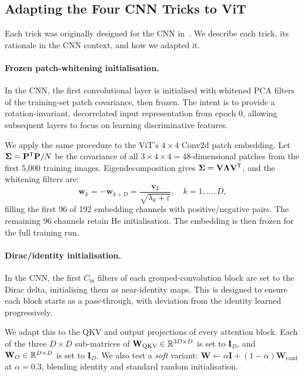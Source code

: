 \subsection{Adapting the Four CNN Tricks to ViT}

Each trick was originally designed for the CNN in~\cite{garg2024cifar10}.
We describe each trick, its rationale in the CNN context, and how we adapted it.

\paragraph{Frozen patch-whitening initialisation.}
In the CNN, the first convolutional layer is initialised with whitened PCA filters of the training-set patch covariance, then frozen.
The intent is to provide a rotation-invariant, decorrelated input representation from epoch 0, allowing subsequent layers to focus on learning discriminative features.

We apply the same procedure to the ViT's $4\times4$ Conv2d patch embedding.
Let $\mathbf{\Sigma} = \mathbf{P}^{\mathsf{T}} \mathbf{P}/N$ be the covariance of all $3\times4\times4 = 48$-dimensional patches from the first 5{,}000 training images.
Eigendecomposition gives $\mathbf{\Sigma} = \mathbf{V} \mathbf{\Lambda} \mathbf{V}^{\mathsf{T}}$, and the whitening filters are:
\begin{equation}
    \mathbf{w}_k = -\mathbf{w}_{k+D} =
    \frac{\mathbf{v}_k}{\sqrt{\lambda_k + \varepsilon}},
    \quad k=1,\dots,D,
\end{equation}
filling the first 96 of 192 embedding channels with positive/negative pairs.
The remaining 96 channels retain He initialisation.
The embedding is then frozen for the full training run.

\paragraph{Dirac/identity initialisation.}
In the CNN, the first $C_\text{in}$ filters of each grouped-convolution block are set to the Dirac delta, initialising them as near-identity maps.
This is designed to ensure each block starts as a pass-through, with deviation from the identity learned progressively.

We adapt this to the QKV and output projections of every attention block.
Each of the three $D \times D$ sub-matrices of $\mathbf{W}_\text{QKV} \in \mathbb{R}^{3D \times D}$ is set to $\mathbf{I}_D$, and $\mathbf{W}_O \in \mathbb{R}^{D \times D}$ is set to $\mathbf{I}_D$.
We also test a \emph{soft} variant: $\mathbf{W} \leftarrow \alpha \mathbf{I} + \left( 1 - \alpha \right) \mathbf{W}_\text{rand}$ at $\alpha = 0.3$, blending identity and standard random initialisation.

